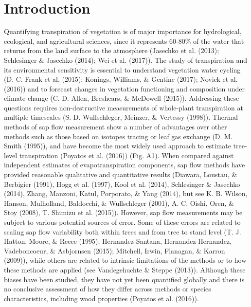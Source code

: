 \documentclass[11pt,twoside]{reedthesis}
\begin{document}
\newpage

\section{Introduction}\label{introduction}

Quantifying transpiration of vegetation is of major importance for
hydrological, ecological, and agricultural sciences, since it represents
60-80\% of the water that returns from the land surface to the
atmosphere (Jasechko et al. (2013); Schlesinger \& Jasechko (2014); Wei
et al. (2017)). The study of transpiration and its environmental
sensitivity is essential to understand vegetation water cycling (D. C.
Frank et al. (2015); Konings, Williams, \& Gentine (2017); Novick et al.
(2016)) and to forecast changes in vegetation functioning and
composition under climate change (C. D. Allen, Breshears, \& McDowell
(2015)). Addressing these questions requires non-destructive
measurements of whole-plant transpiration at multiple timescales (S. D.
Wullschleger, Meinzer, \& Vertessy (1998)). Thermal methods of sap flow
measurement show a number of advantages over other methods such as those
based on isotopes tracing or leaf gas exchange (D. M. Smith (1995)), and
have become the most widely used approach to estimate tree-level
transpiration (Poyatos et al. (2016)) (Fig. A1). When compared against
independent estimates of evapotranspiration components, sap flow methods
have provided reasonable qualitative and quantitative results (Diawara,
Loustau, \& Berbigier (1991), Hogg et al. (1997), Kool et al. (2014),
Schlesinger \& Jasechko (2014), Zhang, Manzoni, Katul, Porporato, \&
Yang (2014), but see K. B. Wilson, Hanson, Mulholland, Baldocchi, \&
Wullschleger (2001), A. C. Oishi, Oren, \& Stoy (2008), T. Shimizu et
al. (2015)). However, sap flow measurements may be subject to various
potential sources of error. Some of these errors are related to scaling
sap flow variability both within trees and from tree to stand level (T.
J. Hatton, Moore, \& Reece (1995); Hernandez-Santana,
Hernandez-Hernandez, Vadeboncoeur, \& Asbjornsen (2015); Mitchell,
Irwin, Flanagan, \& Karron (2009)), while others are related to
intrinsic limitations of the methods or to how these methods are applied
(see Vandegehuchte \& Steppe (2013)). Although these biases have been
studied, they have not yet been quantified globally and there is no
conclusive assessment of how they differ across methods or species
characteristics, including wood properties (Poyatos et al. (2016)).\par
\end{document}
